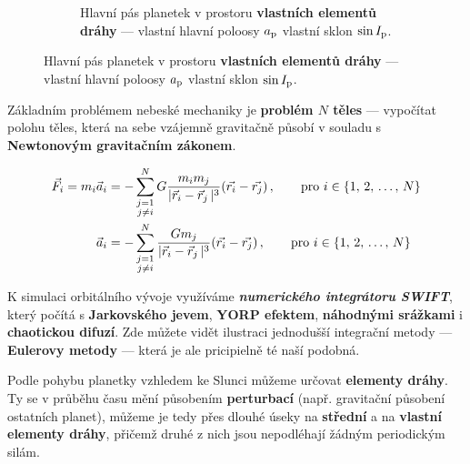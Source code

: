 \documentclass{beamer}
\newlength{\sep}
\newlength{\vyska}
\newlength{\vyskaA}
\newlength{\side}
\begin{document}
\begin{frame}
\begin{columns}[t]
\begin{column}{\side}
\begin{tcolorbox}[title=Úvod\phantom{Úy},height=0.335\vyskaA,parbox=false]
\begin{figure}[!htb]
\begin{subfigure}[t]{0.55\textwidth}
			\caption{Hlavní pás planetek v prostoru \textbf{vlastních elementů dráhy} --- vlastní hlavní poloosy $a_{\rm p}$ vlastní sklon $\sin I_{\rm p}$.} \label{fig:belt}
			\end{subfigure}
		\end{figure}
	\end{tcolorbox}

\vspace{\sep}

	\begin{tcolorbox}[title=Metody\phantom{Úy},height=0.665\vyskaA]

		Základním problémem nebeské mechaniky je \textbf{problém $N$ těles} --- vypočítat polohu těles, která na sebe vzájemně gravitačně působí v souladu s \textbf{Newtonovým gravitačním zákonem}.

		{\footnotesize
		\begin{align*} 
			\vec{F}_i = m_i\vec{a}_i &= -\sum_{\substack{j=1 \\ j\neq i}}^N G\frac{m_im_j}{\lvert \vec{r}_i-\vec{r}_j \,\rvert^3}(\vec{r_i}-\vec{r_j})\,, \qquad{\rm pro}\ i\in\{1,\,2,\,\dots,\,N\} \\
			\vec{a}_i &= -\sum_{\substack{j=1 \\ j\neq i}}^N \frac{Gm_j}{\lvert \vec{r}_i-\vec{r}_j \,\rvert^3}(\vec{r_i}-\vec{r_j})\,, \qquad{\rm pro}\ i\in\{1,\,2,\,\dots,\,N\} 
		\end{align*}}

K simulaci orbitálního vývoje využíváme \textbf{\it numerického integrátoru SWIFT}, který počítá s \textbf{Jarkovského jevem}, \textbf{YORP efektem}, \textbf{náhodnými srážkami} i \textbf{chaotickou difuzí}. Zde můžete vidět ilustraci jednodušší integrační metody --- \textbf{Eulerovy metody} --- která je ale pricipielně té naší podobná. 
		\begin{figure}[!htb]
			\centering 
			\begin{subfigure}[b]{0.45\textwidth}
			\centering 
			\end{subfigure}
			\begin{subfigure}[b]{0.45\textwidth}
			\centering 
			\end{subfigure}
		\end{figure}
		\vspace{-36pt}
		Podle pohybu planetky vzhledem ke Slunci můžeme určovat \textbf{elementy dráhy}. Ty se v průběhu času mění působením \textbf{perturbací} (např. gravitační působení ostatních planet), můžeme je tedy přes dlouhé úseky  na \textbf{střední} a na \textbf{vlastní elementy dráhy}, přičemž druhé z nich jsou nepodléhají žádným periodickým silám.


\end{tcolorbox}
\end{column}
\end{columns}
\end{frame}
\end{document}
